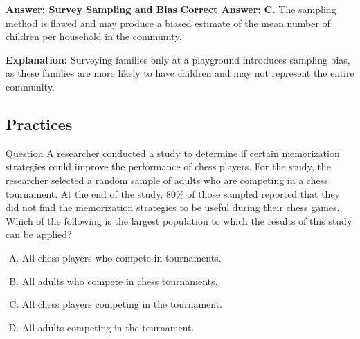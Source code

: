 \documentclass{beamer}
\begin{document}
\begin{frame}{\textbf{Answer: Survey Sampling and Bias}}
\textbf{Correct Answer:} \textbf{C.} The sampling method is flawed and may produce a biased estimate of the mean number of children per household in the community.

\textbf{Explanation:} 
Surveying families only at a playground introduces sampling bias, as these families are more likely to have children and may not represent the entire community.
\end{frame}


\begin{frame}
\section{Practices}
\end{frame}

\begin{frame}{Question}
A researcher conducted a study to determine if certain memorization strategies could improve the performance of chess players. For the study, the researcher selected a random sample of adults who are competing in a chess tournament. At the end of the study, 80\% of those sampled reported that they did not find the memorization strategies to be useful during their chess games. Which of the following is the largest population to which the results of this study can be applied?

\begin{enumerate}[A.]
    \item All chess players who compete in tournaments.
    \item All adults who compete in chess tournaments.
    \item All chess players competing in the tournament.
    \item All adults competing in the tournament.
\end{enumerate}
\end{frame}
\end{document}
